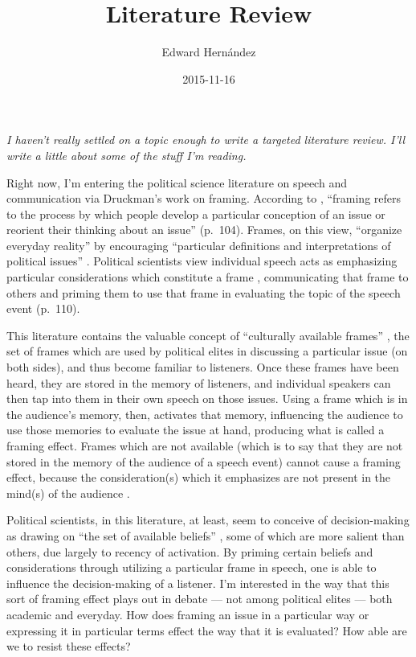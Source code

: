 \documentclass[doc,12pt]{apa6}
\begin{document}
\title{Literature Review}
\author{Edward Hern\'{a}ndez}
\date{2015-11-16}
\maketitle

\noindent
\emph{
I haven't really settled on a topic enough to write a targeted literature
review. I'll write a little about some of the stuff I'm reading.
}

\vspace{12pt}

Right now, I'm entering the political science literature on speech and
communication via Druckman's work on framing. According to ,
``framing refers to the process by which people develop a particular conception
of an issue or reorient their thinking about an issue'' (p.~104). Frames, on
this view, ``organize everyday reality'' \cite[p.~193]{Tuchman78} by
encouraging ``particular definitions and interpretations of political issues''
\cite[p.~343]{Shah02}. Political scientists view individual speech acts as
emphasizing particular considerations which constitute a frame
\cite[p~106]{Chong07}, communicating that frame to others and priming them to
use that frame in evaluating the topic of the speech event (p.~110).

This literature contains the valuable concept of ``culturally available
frames'' \cite[p.~144]{Gamson87}, the set of frames which are used by political
elites in discussing a particular issue (on both sides), and thus become
familiar to listeners. Once these frames have been heard, they are stored in
the memory of listeners, and individual speakers can then tap into them in
their own speech on those issues. Using a frame which is in the audience's
memory, then, activates that memory, influencing the audience to use those
memories to evaluate the issue at hand, producing what is called a framing
effect. Frames which are not available (which is to say that they are not
stored in the memory of the audience of a speech event) cannot cause a framing
effect, because the consideration(s) which it emphasizes are not present in the
mind(s) of the audience \cite[p.~110]{Chong07}.

Political scientists, in this literature, at least, seem to conceive of
decision-making as drawing on ``the set of available beliefs''
\cite[p~111]{Chong07}, some of which are more salient than others, due largely
to recency of activation. By priming certain beliefs and considerations through
utilizing a particular frame in speech, one is able to influence the
decision-making of a listener. I'm interested in the way that this sort of
framing effect plays out in debate --- not among political elites --- both
academic and everyday. How does framing an issue in a particular way or
expressing it in particular terms effect the way that it is evaluated? How able
are we to resist these effects?
\end{document}
